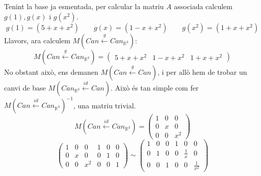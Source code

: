 \documentclass[a4paper, 12pt]{article}
\begin{document}
    \begin{solucio}
        Tenint la base ja esmentada, per calcular la matriu $A$ associada calculem $g(1), g(x)\text{ i }g(x^2)$.
        \begin{displaymath}
            g(1) = (5+x+x^2)\qquad g(x) = (1-x+x^2)\qquad g(x^2) = (1+x+x^2)
        \end{displaymath}
        Llavors, ara calculem $M(Can \xleftarrow{g} Can_{\mathbb{R}^3})$:
        \begin{displaymath}
            M(Can \xleftarrow{g} Can_{\mathbb{R}^3}) = \left(
                \begin{array}{ccc}
                    5+x+x^2&1-x+x^2&1+x+x^2
                \end{array}
            \right)
        \end{displaymath}
        No obstant això, ens demanen $M(Can \xleftarrow{g} Can)$, i per allò hem de trobar un canvi
        de base $M(Can_{\mathbb{R}^3} \xleftarrow{id} Can)$. Això és tan simple com fer $M(Can \xleftarrow{id} Can_{\mathbb{R}^3})^{-1}$,
        una matriu trivial.
        \begin{displaymath}
            M(Can \xleftarrow{id} Can_{\mathbb{R}^3}) = \left(
                \begin{array}{c|c|c}
                    1 & 0 & 0\\
                    0 & x & 0\\
                    0 & 0 & x^2
                \end{array}
            \right)
        \end{displaymath}
        \begin{displaymath}
            \left(
                \begin{array}{ccc|ccc}
                    1 & 0 & 0 & 1 & 0 & 0\\
                    0 & x & 0 & 0 & 1 & 0\\
                    0 & 0 & x^2 & 0 & 0 & 1
                \end{array}
            \right)
            \sim
            \left(
                \begin{array}{ccc|ccc}
                    1 & 0 & 0 & 1 & 0 & 0\\
                    0 & 1 & 0 & 0 & \frac{1}{x} & 0\\
                    0 & 0 & 1 & 0 & 0 & \frac{1}{x^2}
                \end{array}
            \right)
        \end{displaymath}

\end{solucio}
\end{document}
